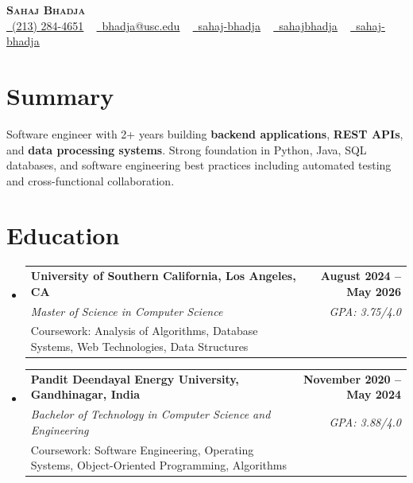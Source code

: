\documentclass[letterpaper,10pt]{article}
\makeatletter
\newcommand{\resumeEduSubheading}[5]{\vspace{-1pt}\item\begin{tabular*}{1.0\textwidth}[t]{l@{\extracolsep{\fill}}r}\textbf{#1} & \textbf{\small #2} \\\textit{\small #3} & \textit{\small #4} \\\small #5 & \\\end{tabular*}\vspace{-4pt}}
\newcommand{\resumeSubHeadingListStart}{\begin{itemize}[leftmargin=0.0in, label={}]}
\newcommand{\resumeSubHeadingListEnd}{\end{itemize}}
\makeatother
\begin{document}
\begin{center}
{\Huge \scshape \textbf{Sahaj Bhadja}} \\ \vspace{1pt}
\small \href{tel:(213) 284-4651}{\faPhone\ \underline{(213) 284-4651}} ~ \href{mailto:bhadja@usc.edu}{\raisebox{-0.2\height}\faEnvelope\ \underline{bhadja@usc.edu}} ~
\href{https://www.linkedin.com/in/sahaj-bhadja/}{\raisebox{-0.2\height}\faLinkedin\ \underline{sahaj-bhadja}} ~ \href{https://github.com/SAHAJ-BHADJA}{\raisebox{-0.2\height}\faGithub\ \underline{sahajbhadja}} ~
\href{https://sahaj-bhadja.vercel.app/}{\raisebox{-0.2\height}\faGlobe\ \underline{sahaj-bhadja}}
\end{center}
\vspace{-18pt}
\section{Summary}
\begin{itemize}[leftmargin=0.15in, label={}]
\small{\item{Software engineer with 2+ years building \textbf{backend applications}, \textbf{REST APIs}, and \textbf{data processing systems}. Strong foundation in Python, Java, SQL databases, and software engineering best practices including automated testing and cross-functional collaboration.}}
\end{itemize}
\vspace{-16pt}
\section{Education}
\resumeSubHeadingListStart
\resumeEduSubheading{University of Southern California, Los Angeles, CA}{August 2024 -- May 2026}{Master of Science in Computer Science}{GPA: 3.75/4.0}{Coursework: Analysis of Algorithms, Database Systems, Web Technologies, Data Structures}
\vspace{-9pt}
\resumeEduSubheading{Pandit Deendayal Energy University, Gandhinagar, India}{November 2020 -- May 2024}{Bachelor of Technology in Computer Science and Engineering}{GPA: 3.88/4.0}{Coursework: Software Engineering, Operating Systems, Object-Oriented Programming, Algorithms}
\resumeSubHeadingListEnd
\vspace{-14pt}
\end{document}

